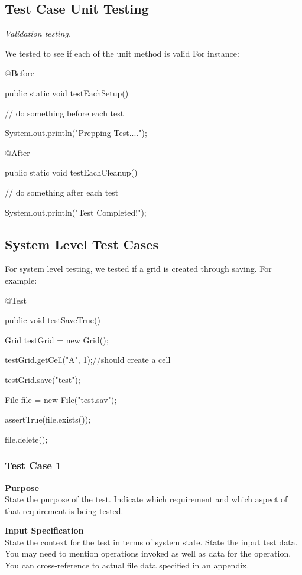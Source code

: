 \documentclass[12pt]{article}
\begin{document}
\subsection{Test Case Unit Testing}
{\it
Validation testing.

We tested to see if each of the unit method is valid
For instance:


  @Before

  public static void testEachSetup() {

    // do something before each test

    System.out.println("Prepping Test....");

  }
  
  @After

  public static void testEachCleanup() {

    // do something after each test

    System.out.println("Test Completed!");

  }



\subsection{System Level Test Cases}

For system level testing, we tested if a grid is created through saving.
For example:

  @Test

  public void testSaveTrue() {

	    Grid testGrid = new Grid();

	    testGrid.getCell("A", 1);//should create a cell

	    testGrid.save("test");

	    File file = new File("test.sav");

	    assertTrue(file.exists());

	    file.delete();

  }


\subsubsection{Test Case 1} \label{tc:1}

\noindent
{\bf Purpose}\\
State the purpose of the test.
Indicate which requirement and which aspect of that requirement is being tested.

\noindent
{\bf Input Specification}\\
State the context for the test in terms of system state.
State the input test data. You may need to mention operations invoked as well as data for the operation.
You can cross-reference to actual file data specified in an appendix.

}
\end{document}
